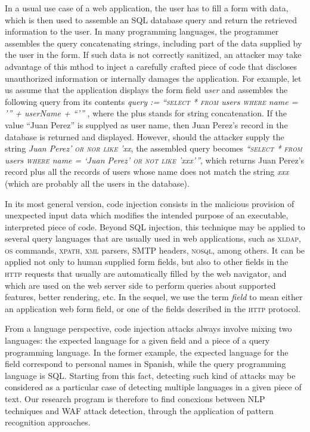\documentclass[runningheads,a4paper]{llncs}
\newcommand{\HTTP}{\textsc{http}\xspace}
\begin{document}
In a usual use case of a web application, the user has to fill a form with data, which is then used to assemble an SQL database query and return the retrieved information to the user. In many programming languages, the programmer assembles the query concatenating strings, including part of the data supplied by the user in the form. If such data is not correctly sanitized, an attacker may take advantage of this mthod to inject a carefully crafted piece of code that discloses unauthorized information or internally damages the application. For example, let us assume that the application displays the form field \textit{user} and assembles the following query from its contents \textit{query := \enquote{\textsc{select} * \textsc{from} users \textsc{where} name = '} + userName \textsc{+} \enquote{'} }, where the plus stands for string concatenation. If the value \enquote{Juan Perez} is supplyed as user name, then Juan Perez's record in the database is returned and displayed. However, should the attacker supply the string \textit{Juan Perez' \textsc{or nor like} 'xx}, the assembled query becomes \textit{\enquote{\textsc{select} * \textsc{from} users \textsc{where} name = ‘Juan Perez’ \textsc{or not like} 'xxx'}}, which returns Juan Perez's record plus all the records of users whose name does not match the string \textit{xxx} (which are probably all the users in the database). 

In its most general version, code injection consists in the malicious provision of unexpected input data which modifies the intended purpose of an executable, interpreted piece of code. Beyond SQL injection, this technique may be applied to several query languages that are usually used in web applications, such as \textsc{xldap}, \textsc{os} commands, \textsc{xpath}, \textsc{xml} parsers, \textsc{SMTP} headers, \textsc{nosql}, among others. It can be applied not only to human supplied form fields, but also to other fields in the \HTTP requests that usually are automatically filled by the web navigator, and which are used on the web server side to perform queries about supported features, better rendering, etc. In the sequel, we use the term \textit{field} to mean either an application web form field, or one of the fields described in the \HTTP protocol.

From a language perspective, code injection attacks always involve mixing two languages: the expected language for a given field and a piece of a query programming language. In the former example, the expected language for the field correspond to personal names in Spanish, while the query programming language is SQL. Starting from this fact, detecting such kind of attacks may be considered as a particular case of detecting multiple languages in a given piece of text. Our research program is therefore to find conexions between NLP techniques and WAF attack detection, through the application of pattern recognition approaches.
\end{document}
